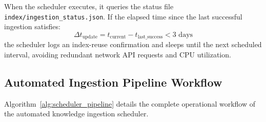 When the scheduler executes, it queries the status file \texttt{index/ingestion\_status.json}. If the elapsed time since the last successful ingestion satisfies:
\begin{equation}
\Delta t_{\text{update}} = t_{\text{current}} - t_{\text{last\_success}} < 3\text{ days}
\end{equation}
the scheduler logs an index-reuse confirmation and sleeps until the next scheduled interval, avoiding redundant network API requests and CPU utilization.

\subsection{Automated Ingestion Pipeline Workflow}
Algorithm~\ref{alg:scheduler_pipeline} details the complete operational workflow of the automated knowledge ingestion scheduler.

